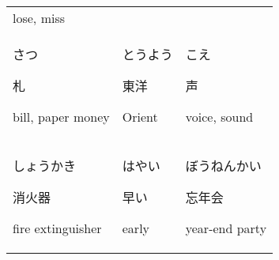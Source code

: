\documentclass[12pt, a4j, landscape, dvipdfmx]{utarticle}
\begin{document}
\begin{minipage}[t][0pt]{\linewidth }
\begin{tabular}{||p{5.5cm}||p{5.5cm}||p{5.5cm}||}
            {\small lose, miss}\tabularnewline
            \hhline{|:=::=::=:|} \rule{0pt}{3ex}
            \hspace*{-.4cm} {\LARGE さつ}\newline
            \rule{0pt}{3ex} \hspace*{.4cm} {\small
            札}\newline \rule{0pt}{3ex} \hspace*{.425cm}
            {\small bill, paper money}&\rule{0pt}{3ex}
            \hspace*{-.4cm} {\LARGE とうよう}\newline
            \rule{0pt}{3ex} \hspace*{.4cm} {\small
            東洋}\newline \rule{0pt}{3ex} \hspace*{.425cm}
            {\small Orient}&\rule{0pt}{3ex} \hspace*{-.4cm}
            {\LARGE こえ}\newline \rule{0pt}{3ex}
            \hspace*{.4cm} {\small 声}\newline
            \rule{0pt}{3ex} \hspace*{.425cm} {\small
            voice, sound}\tabularnewline
            \hhline{|:=::=::=:|} \rule{0pt}{3ex}
            \hspace*{-.4cm} {\LARGE しょうかき}\newline
            \rule{0pt}{3ex} \hspace*{.4cm} {\small
            消火器}\newline \rule{0pt}{3ex} \hspace*{.425cm}
            {\small fire extinguisher}&\rule{0pt}{3ex}
            \hspace*{-.4cm} {\LARGE はやい}\newline
            \rule{0pt}{3ex} \hspace*{.4cm} {\small
            早い}\newline \rule{0pt}{3ex} \hspace*{.425cm}
            {\small early}&\rule{0pt}{3ex} \hspace*{-.4cm}
            {\LARGE ぼうねんかい}\newline \rule{0pt}{3ex}
            \hspace*{.4cm} {\small 忘年会}\newline
            \rule{0pt}{3ex} \hspace*{.425cm} {\small
            year-end party}\tabularnewline

\end{tabular}
\end{minipage}
\end{document}
